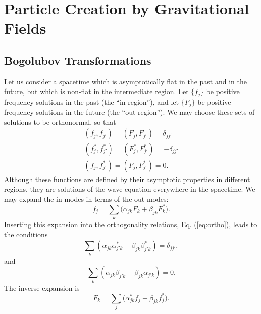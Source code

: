 \documentclass[12pt,onecolumn,eqsecnum,floats,aps,prd,floatfix,titlepage,tightenlines]{revtex4-2}
\begin{document}
\section{Particle Creation by Gravitational Fields}
\label{sec:particle-creation}


\subsection{Bogolubov Transformations}
\label{sec:Bogolubov}

    Let us consider a spacetime which is asymptotically flat in the past
and in the future, but which is non-flat in the intermediate region.
Let $\{ f_j \}$ be positive frequency solutions in the past (the 
``in-region''), and let $\{ F_j \}$ be positive frequency solutions in 
the future (the ``out-region'').  We may choose these sets of solutions
to be orthonormal, so that
\begin{eqnarray}
&(f_j,f_{j'})= (F_{j},F_{j'})=\delta _{jj'}& \nonumber \\
&(f_j^*,f_{j'}^*)= (F_{j}^*,F_{j'}^*)= -\delta _{jj'}& \nonumber \\
&(f_j,f_{j'}^*)= (F_{j},F_{j'}^*)= 0.&  \label{eq:ortho}
\end{eqnarray}
Although these functions are defined by their asymptotic properties in
different regions, they are solutions of the wave equation everywhere
in the spacetime. We may expand the in-modes in terms of the out-modes:
\begin{equation}
f_j=\sum\limits_k {(\alpha _{jk}}F_k + \beta _{jk}F_k^*).
\label{eq:in-out}
\end{equation}
Inserting this expansion into the orthogonality relations, 
Eq. (\ref{eq:ortho}), leads to the conditions
\begin{equation}
\sum\limits_k {(\alpha _{jk}\alpha _{j'k}^*-\beta _{jk}\beta_{j'k}^*)
= \delta _{jj'}}, \label{eq:alphabeta}
\end{equation}
and
\begin{equation}
 \sum\limits_k (\alpha _{jk}\beta _{j'k}-\beta _{jk}\alpha _{j'k})=0.
\end{equation}
The inverse expansion is 
\begin{equation}
F_k=\sum\limits_j {(\alpha _{jk}^*}f_j - \beta _{jk}f_j^*).
\end{equation}
\end{document}
